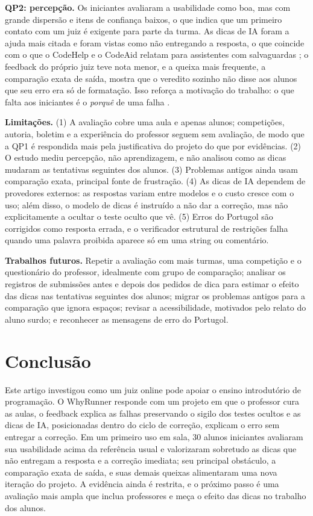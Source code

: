\documentclass[12pt]{article}
\begin{document}
\textbf{QP2: percepção.} Os iniciantes avaliaram a usabilidade como boa, mas com grande dispersão e itens de confiança baixos, o que indica que um primeiro contato com um juiz é exigente para parte da turma. As dicas de IA foram a ajuda mais citada e foram vistas como não entregando a resposta, o que coincide com o que o CodeHelp e o CodeAid relatam para assistentes com salvaguardas \cite{liffiton2023codehelp,kazemitabaar2024codeaid}; o feedback do próprio juiz teve nota menor, e a queixa mais frequente, a comparação exata de saída, mostra que o veredito sozinho não disse aos alunos que seu erro era só de formatação. Isso reforça a motivação do trabalho: o que falta aos iniciantes é o \emph{porquê} de uma falha \cite{keuning2018systematic}.

\textbf{Limitações.} (1) A avaliação cobre uma aula e apenas alunos; competições, autoria, boletim e a experiência do professor seguem sem avaliação, de modo que a QP1 é respondida mais pela justificativa do projeto do que por evidências. (2) O estudo mediu percepção, não aprendizagem, e não analisou como as dicas mudaram as tentativas seguintes dos alunos. (3) Problemas antigos ainda usam comparação exata, principal fonte de frustração. (4) As dicas de IA dependem de provedores externos: as respostas variam entre modelos e o custo cresce com o uso; além disso, o modelo de dicas é instruído a não dar a correção, mas não explicitamente a ocultar o teste oculto que vê. (5) Erros do Portugol são corrigidos como resposta errada, e o verificador estrutural de restrições falha quando uma palavra proibida aparece só em uma string ou comentário.

\textbf{Trabalhos futuros.} Repetir a avaliação com mais turmas, uma competição e o questionário do professor, idealmente com grupo de comparação; analisar os registros de submissões antes e depois dos pedidos de dica para estimar o efeito das dicas nas tentativas seguintes dos alunos; migrar os problemas antigos para a comparação que ignora espaços; revisar a acessibilidade, motivados pelo relato do aluno surdo; e reconhecer as mensagens de erro do Portugol.

\section{Conclusão}

Este artigo investigou como um juiz online pode apoiar o ensino introdutório de programação. O WhyRunner responde com um projeto em que o professor cura as aulas, o feedback explica as falhas preservando o sigilo dos testes ocultos e as dicas de IA, posicionadas dentro do ciclo de correção, explicam o erro sem entregar a correção. Em um primeiro uso em sala, 30 alunos iniciantes avaliaram sua usabilidade acima da referência usual e valorizaram sobretudo as dicas que não entregam a resposta e a correção imediata; seu principal obstáculo, a comparação exata de saída, e suas demais queixas alimentaram uma nova iteração do projeto. A evidência ainda é restrita, e o próximo passo é uma avaliação mais ampla que inclua professores e meça o efeito das dicas no trabalho dos alunos.



\end{document}
